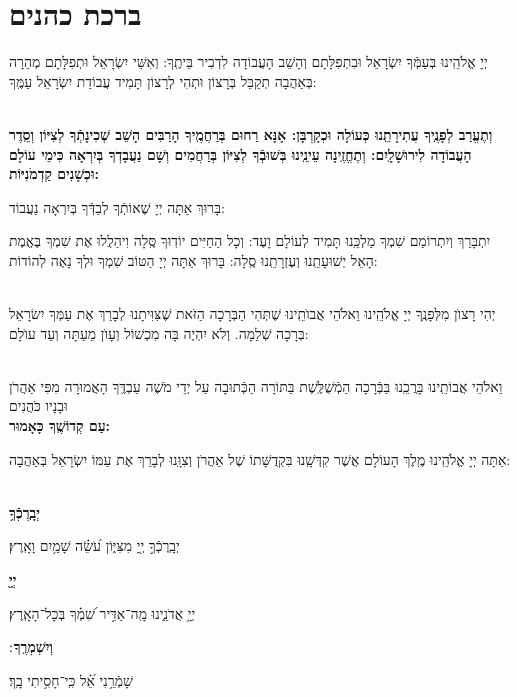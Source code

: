 \documentclass[twoside, openany, parskip=half, 11pt]{book}
\begin{document}
\sepline

\clearpage

\vspace{-1\baselineskip}
\section[ברכת כהנים]{ ברכת כהנים ‎}
\label{birkaskohanim}

	 יְיָ אֱלֹהֵֽינוּ בְּעַמְּֿךָ יִשְׂרָאֵל וּבִתְפִלָּתָם וְהָשֵׁב הָעֲבוֹדָה לִדְבִיר בֵּיתֶֽךָ: וְאִשֵּׁי יִשְׂרָאֵל וּתְפִלָּתָם מְהֵרָה בְּאַהֲבָה תְקַבֵּל בְּרָצוֹן וּתְהִי לְרָצוֹן תָּמִיד עֲבוֹדַת יִשְׂרָאֵל עַמֶּֽךָ:
	
\chazzanvkahal \\
\textbf{
וְתֶעֱרַב לְפָנֶֽיךָ עֲתִירָתֵֽנוּ כְּעוֹלָה וּכְקָרְבָּן: 
אָנָּא רַחוּם בְּרַחֲמֶֽיךָ הָרַבִּים הָשֵׁב שְׁכִינָתְֿךָ לְצִיּוֹן וְסֵֽדֶר הָעֲבוֹדָה לִירוּשָׁלָֽיִם:
וְתֶחֱזֶֽינָה עֵינֵֽינוּ בְּשׁוּבְֿךָ לְצִיּוֹן בְּרַחֲמִים 
וְשָׁם נַעֲבָדְךָ בְּיִרְאָה כִּימֵי עוֹלָם וּכְשָׁנִים קַדְמֹנִיּוֹת:
} 

\chazzan
בָּרוּךְ אַתָּה יְיָ שֶׁאוֹתְֿךָ לְבַדְּֿךָ בְּיִרְאָה נַעֲבוֹד:

\modim

 יִתְבָּרַךְ וְיִתְרוֹמַם שִׁמְךָ מַלְכֵּֽנוּ תָּמִיד לְעוֹלָם וָעֶד: וְכָל הַחַיִּים יוֹדֽוּךָ סֶּֽלָה וִיהַלֲלוּ אֶת שִׁמְךָ בֶּאֱמֶת הָאֵל יְשׁוּעָתֵֽנוּ וְעֶזְרָתֵֽנוּ סֶֽלָה: בָּרוּךְ אַתָּה יְיָ הַטּוֹב שִׁמְךָ וּלְךָ נָאֶה לְהוֹדוֹת:

\\
יְהִי רָצוׂן מִלְּפָנֶֽךָ יְיָ אֱלֹהֵֽינוּ וֵאלֹהֵי אֲבוׂתֵֽינוּ שֶׁתְּהִי הַבְּרָכָה הַזֹּאת שֶׁצִּוִּיתָנוּ לְבָרֵךְ אֶת עַמְּךָ יִשׂרָאֵל בְּרָכָה שְׁלֵמָה. וְלֹא יִהְיֶה בָּה מִכְשׁוֹל וְעָוׂן מֵעַתָּה וְעַד עוׂלָם:

\\
\shatz {}
 וֵאלֹהֵי אֲבוֹתֵֽינוּ בָּרֲכֵֽנוּ בַּבְּֿרָכָה הַמְֿשֻׁלֶּֽשֶׁת בַּתּוֹרָה הַכְּֿתוּבָה עַל יְדֵי מֹשֶׁה עַבְדֶּֽךָ הָאֲמוּרָה מִפִּי אַהֲרֹן וּבָנָיו כֹּהֲנִים \\
 \shatzvkahal
\textbf{עַם קְדוֹשֶֽׁךָ כָּאָמוּר:}

 אַתָּה יְיָ אֱלֹהֵֽינוּ מֶֽלֶךְ הָעוֹלָם אֲשֶׁר קִדְּשָֽׁנוּ בִּקְדֻשָּׁתוֹ שֶׁל אַהֲרֹן  וְצִוָּֽנוּ לְבָרֵךְ אֶת עַמּוֹ יִשְׂרָאֵל בְּאַהֲבָה:


\\
\textbf{יְבָֽרֶכְֿךָ֥}
	\hfill \begin{footnotesize}
 	יְבָֽרֶכְֿךָ֣ יְ֖יָ מִצִּיּ֑וֹן עֹ֝שֵׂ֗ה שָׁמַ֥יִם וָאָֽרֶץ׃\\
	\end{footnotesize}
\textbf{יְיָ֖}
	\hfill		\begin{footnotesize}
	יְיָ֥ אֲדֹנֵ֑ינוּ מָֽה־אַדִּ֥יר שִׁ֝מְ֗ךָ בְּכָל־הָאָֽרֶץ׃\\
	\end{footnotesize}
\textbf{וְיִשְׁמְרֶֽךָ}
׃ \hfill		\begin{footnotesize}
 שָׁמְֿרֵ֥נִי אֵ֝֗ל כִּֽי־חָסִ֥יתִי בָֽךְ׃
\end{footnotesize}
\end{document}
